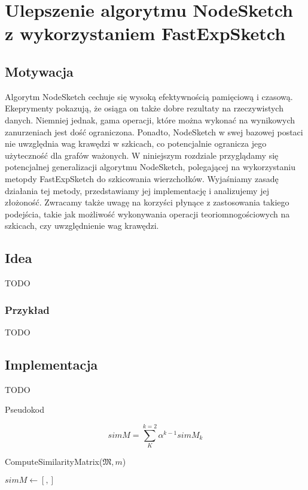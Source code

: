 \chapter{Ulepszenie algorytmu NodeSketch z wykorzystaniem FastExpSketch}
\section{Motywacja}
    Algorytm NodeSketch cechuje się wysoką efektywnością pamięciową i czasową. Ekeprymenty pokazują, że osiąga on także dobre rezultaty na rzeczywistych danych\cite{Yang_Rosso_Li_Cudre-Mauroux_2019}. 
    Niemniej jednak, gama operacji, które można wykonać na wynikowych zanurzeniach jest dość ograniczona. Ponadto, NodeSketch w swej bazowej postaci nie uwzględnia wag krawędzi w szkicach, co potencjalnie ogranicza jego użyteczność dla grafów ważonych.   
    W niniejszym rozdziale przyglądamy się potencjalnej generalizacji algorytmu NodeSketch, polegającej na wykorzystaniu metopdy FastExpSketch do szkicowania wierzchołków. Wyjaśniamy zasadę działania tej metody, przedstawiamy jej implementację i analizujemy jej złożoność. Zwracamy także uwagę na korzyści płynące z zastosowania takiego podejścia, takie jak możliwość wykonywania operacji teoriomnogościowych na szkicach, czy uwzględnienie wag krawędzi.


\section{Idea}
    TODO

    \subsection{Przykład}
        TODO

\section{Implementacja}
    TODO

    Pseudokod

    \begin{equation}  \label{eq:sim_matrix}  
        simM = \sum\limits_{K}^{k = 2} \alpha^{k-1} simM_{k}    
    \end{equation}

    
    \begin{algorithm}
        \caption{ComputeSimilarityMatrix($\mathfrak{M}, m$)}\label{alg:compute_sim_matrix}
        $simM \gets [,]$ \;
    \end{algorithm}

